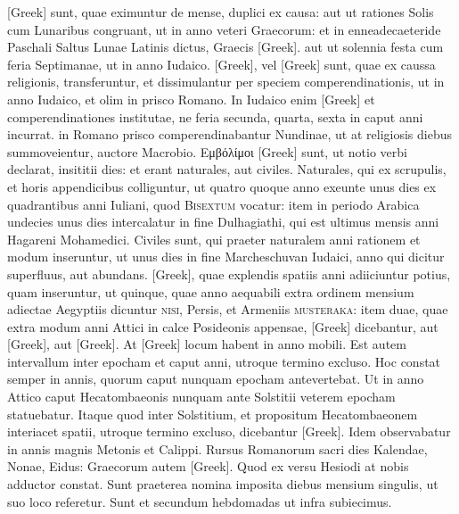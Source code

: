 \textgreek{[Greek]} sunt, quae eximuntur de
mense, duplici ex causa: aut ut rationes Solis cum Lunaribus congruant,
ut in anno veteri Graecorum: et in enneadecaeteride Paschali
Saltus Lunae Latinis dictus, Graecis \textgreek{[Greek]}.
aut ut solennia
festa cum feria Septimanae, ut in anno Iudaico.
\textgreek{[Greek]}, vel \textgreek{[Greek]}
sunt, quae ex caussa religionis, transferuntur, et dissimulantur per speciem
comperendinationis, ut in anno Iudaico, et olim in prisco Romano.
In Iudaico enim \textgreek{[Greek]} et comperendinationes
 institutae, ne
feria secunda, quarta, sexta in caput anni incurrat. in Romano prisco
comperendinabantur Nundinae, ut at religiosis diebus summoveientur,
auctore Macrobio.
\textgreek{Εμβόλίμοι [Greek]} sunt, ut notio verbi declarat, insititii
dies: et erant naturales, aut civiles.
Naturales, qui ex scrupulis, et
horis appendicibus colliguntur, ut quatro quoque anno exeunte unus
dies ex quadrantibus anni Iuliani, quod \textsc{Bisextum} vocatur: item
in periodo Arabica undecies unus dies intercalatur in fine Dulhagiathi,
qui est ultimus mensis anni Hagareni Mohamedici.
Civiles sunt,
qui praeter naturalem anni rationem et modum inseruntur, ut unus
dies in fine Marcheschuvan Iudaici, anno qui dicitur superfluus, aut
abundans.
\textgreek{[Greek]}, quae explendis spatiis anni adiiciuntur potius,
quam inseruntur, ut quinque, quae anno aequabili extra ordinem mensium
adiectae Aegyptiis dicuntur \textsc{nisi}, Persis, et Armeniis
 \textsc{musteraka}: 
item duae, quae extra modum anni Attici in calce Posideonis
appensae, \textgreek{[Greek]} dicebantur,
 aut \textgreek{[Greek]}, aut \textgreek{[Greek]}.
At \textgreek{[Greek]} locum habent in anno mobili.
Est autem intervallum
inter epocham et caput anni, utroque termino excluso.
Hoc
constat semper in annis, quorum caput nunquam epocham antevertebat.
Ut in anno Attico caput Hecatombaeonis nunquam ante Solstitii
veterem epocham statuebatur.
Itaque quod inter Solstitium, et
propositum Hecatombaeonem interiacet spatii, utroque termino excluso,
dicebantur \textgreek{[Greek]}.
Idem observabatur in annis magnis
Metonis et Calippi.
Rursus Romanorum sacri dies Kalendae, Nonae,
Eidus: Graecorum autem \textgreek{[Greek]}.
Quod ex versu Hesiodi at
nobis adductor constat.
Sunt praeterea nomina imposita diebus mensium
singulis, ut suo loco referetur.
Sunt et secundum hebdomadas
ut infra subiecimus.


